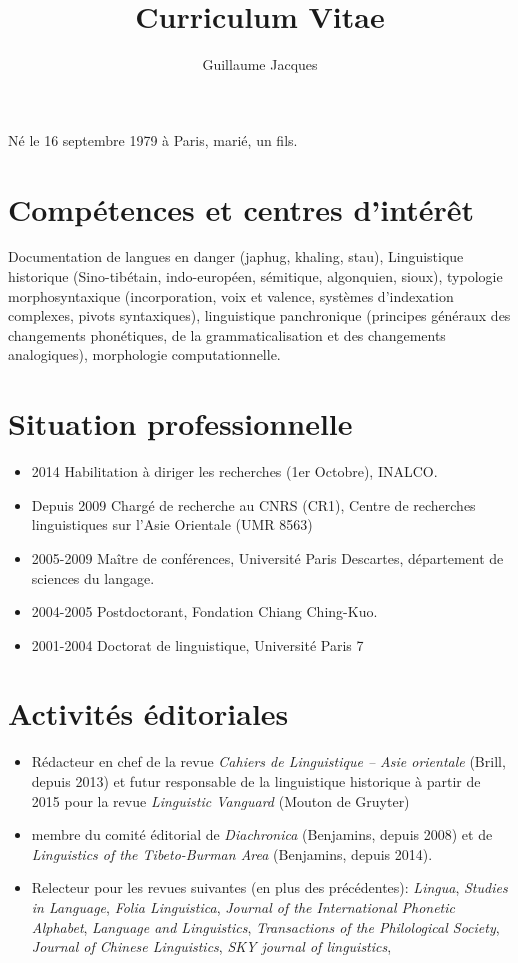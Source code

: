 \documentclass[oldfontcommands,oneside,a4paper,11pt]{article}
\begin{document}
 

  \title{Curriculum Vitae}
 
\author{Guillaume Jacques}
\maketitle
Né le 16 septembre 1979 à Paris, marié, un fils.
\sloppy
\section*{Compétences et centres d’intérêt}
Documentation de langues en danger (japhug, khaling, stau), Linguistique historique (Sino-tibétain, indo-européen, sémitique, algonquien, sioux), typologie morphosyntaxique (incorporation, voix et valence, systèmes d'indexation complexes, pivots syntaxiques), linguistique panchronique (principes généraux des changements phonétiques, de la grammaticalisation et des changements analogiques), morphologie computationnelle.
\section*{Situation professionnelle}
\begin{itemize}
\item 2014 Habilitation à diriger les recherches (1er Octobre), INALCO.
\item Depuis 2009 Chargé de recherche au CNRS (CR1), Centre de recherches linguistiques sur l'Asie Orientale (UMR 8563)
\item 2005-2009 Maître de conférences, Université Paris Descartes, département de sciences du langage.
\item 2004-2005 Postdoctorant, Fondation Chiang Ching-Kuo.
\item 2001-2004 Doctorat de linguistique, Université Paris 7
\end{itemize}
\section*{Activités éditoriales}
\begin{itemize}
\item Rédacteur en chef de la revue \textit{Cahiers de Linguistique -- Asie orientale} (Brill, depuis 2013) et futur responsable de la linguistique historique à partir de 2015 pour la revue \textit{Linguistic Vanguard} (Mouton de Gruyter)
\item membre du comité éditorial de \textit{Diachronica} (Benjamins, depuis 2008) et de \textit{Linguistics of the Tibeto-Burman Area}  (Benjamins, depuis 2014).
\item Relecteur pour les revues suivantes (en plus des précédentes): \textit{Lingua}, \textit{Studies in Language}, \textit{Folia Linguistica}, \textit{Journal of the International Phonetic Alphabet},  \textit{Language and Linguistics}, \textit{Transactions of the Philological Society}, \textit{Journal of Chinese Linguistics}, \textit{SKY journal of linguistics}, 
\end{itemize}
\end{document}
